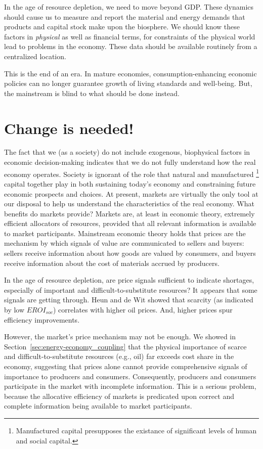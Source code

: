 In the age of resource depletion, 
we need to move beyond GDP.
These dynamics should cause us to measure and report
the material and energy demands that products and capital stock 
make upon the biosphere.
We should know these factors 
in \emph{physical} as well as financial terms,
for constraints of the physical world 
lead to problems in the economy.
These data should be available routinely from a centralized location.

This is the end of an era.
In mature economies, consumption-enhancing 
economic policies can no longer guarantee 
growth of living standards and well-being.
But, the mainstream is blind to what should be done instead. 


\section{Change is needed!}
\label{sec:change_needed}

The fact that we (as a society) do not include exogenous, biophysical factors 
in economic decision-making indicates that
we do not fully understand how the real economy operates.
Society is ignorant of the role that natural and manufactured%
	\footnote{
	Manufactured capital presupposes the existance of 
	significant levels of human and social capital.
	}
capital together play in both sustaining today's economy and 
constraining future economic prospects and choices.
At present, markets are virtually the only tool at our disposal
to help us understand the characteristics of the real economy.
What benefits do markets provide?
Markets are, at least in economic theory, extremely efficient allocators of resources,
provided that all relevant information is available to market participants.
Mainstream economic theory holds that prices are the mechanism by which signals
of value are communicated to sellers and buyers:
sellers receive information about how goods are valued by consumers, and
buyers receive information about the cost of materials accrued by producers.

In the age of resource depletion, 
are price signals sufficient to indicate shortages, 
especially of important and difficult-to-substitute resources?
It appears that some signals are getting through.
Heun and de Wit
showed that scarcity (as indicated by low $EROI_{soc}$)
correlates with higher oil prices.\cite{Heun:2012ek}
And, higher prices spur efficiency improvements.\cite{Vlasic:2013aa}

However, the market's price mechanism may not be enough.
We showed in Section~\ref{sec:energy-economy_coupling}
that the physical importance 
of scarce and difficult-to-substitute resources (e.g., oil) 
far exceeds cost share in the economy,
suggesting that prices alone cannot provide comprehensive
signals of importance to producers and consumers.
Consequently, producers and consumers participate 
in the market with incomplete information.
This is a serious problem, 
because the allocative efficiency of markets 
is predicated upon
correct and complete information being available to market participants.


